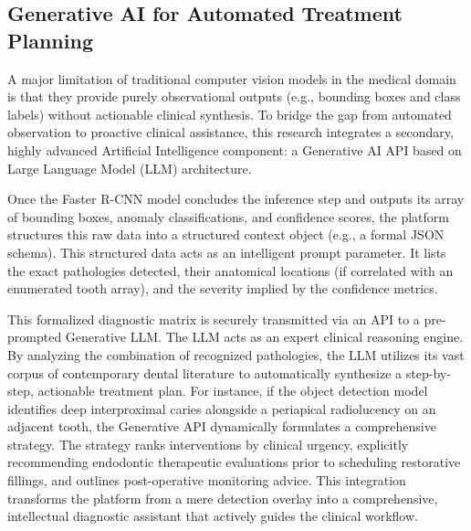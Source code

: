 \subsection{Generative AI for Automated Treatment Planning}
\par A major limitation of traditional computer vision models in the medical domain is that they provide purely observational outputs (e.g., bounding boxes and class labels) without actionable clinical synthesis. To bridge the gap from automated observation to proactive clinical assistance, this research integrates a secondary, highly advanced Artificial Intelligence component: a Generative AI API based on Large Language Model (LLM) architecture.
\par Once the Faster R-CNN model concludes the inference step and outputs its array of bounding boxes, anomaly classifications, and confidence scores, the platform structures this raw data into a structured context object (e.g., a formal JSON schema). This structured data acts as an intelligent prompt parameter. It lists the exact pathologies detected, their anatomical locations (if correlated with an enumerated tooth array), and the severity implied by the confidence metrics.
\par This formalized diagnostic matrix is securely transmitted via an API to a pre-prompted Generative LLM. The LLM acts as an expert clinical reasoning engine. By analyzing the combination of recognized pathologies, the LLM utilizes its vast corpus of contemporary dental literature to automatically synthesize a step-by-step, actionable treatment plan. For instance, if the object detection model identifies deep interproximal caries alongside a periapical radiolucency on an adjacent tooth, the Generative API dynamically formulates a comprehensive strategy. The strategy ranks interventions by clinical urgency, explicitly recommending endodontic therapeutic evaluations prior to scheduling restorative fillings, and outlines post-operative monitoring advice. This integration transforms the platform from a mere detection overlay into a comprehensive, intellectual diagnostic assistant that actively guides the clinical workflow.

